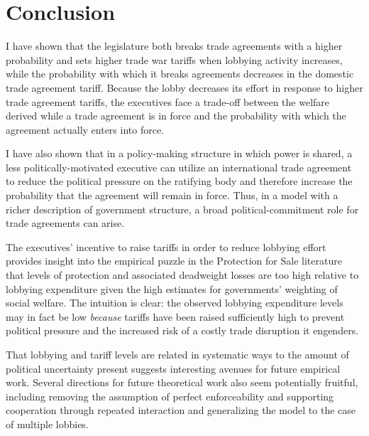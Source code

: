 \documentclass[10pt]{article}
\begin{document}
\section{Conclusion}
\label{sec:concl}
I have shown that the legislature both breaks trade agreements with a higher probability and sets higher trade war tariffs when lobbying activity increases, while the probability with which it breaks agreements decreases in the domestic trade agreement tariff. Because the lobby decreases its effort in response to higher trade agreement tariffs, the executives face a trade-off between the welfare derived while a trade agreement is in force and the probability with which the agreement actually enters into force.

I have also shown that in a policy-making structure in which power is shared, a less politically-motivated executive can utilize an international trade agreement to reduce the political pressure on the ratifying body and therefore increase the probability that the agreement will remain in force. Thus, in a model with a richer description of government structure, a broad political-commitment role for trade agreements can arise.

The executives' incentive to raise tariffs in order to reduce lobbying effort provides insight into the empirical puzzle in the Protection for Sale literature that levels of protection and associated deadweight losses are too high relative to lobbying expenditure given the high estimates for governments' weighting of social welfare. The intuition is clear: the observed lobbying expenditure levels may in fact be low \textit{because} tariffs have been raised sufficiently high to prevent political pressure and the increased risk of a costly trade disruption it engenders.

That lobbying and tariff levels are related in systematic ways to the amount of political uncertainty present suggests interesting avenues for future empirical work. Several directions for future theoretical work also seem potentially fruitful, including removing the assumption of perfect enforceability and supporting cooperation through repeated interaction and generalizing the model to the case of multiple lobbies.

			



\end{document}
